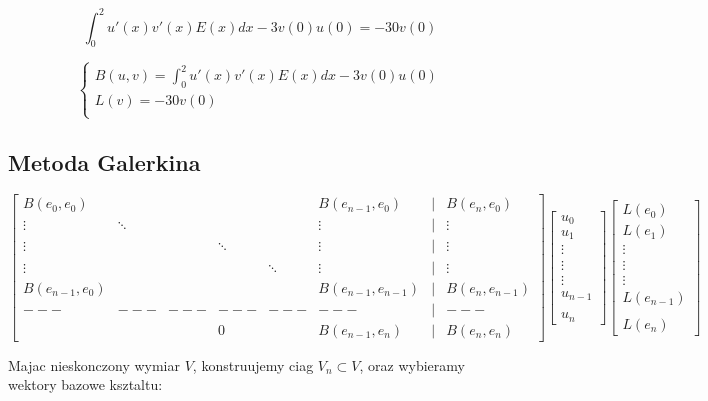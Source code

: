 \documentclass{article}
\begin{document}
\[\int_0^2{u'(x)v'(x)E(x)dx} - 3v(0)u(0)= -30 v(0)\]

\begin{equation*}
  \begin{cases}
B(u,v) =\int_0^2{u'(x)v'(x)E(x)dx} - 3v(0)u(0) \\
 L(v) =  -30 v(0) \\
  \end{cases}
\end{equation*}

\subsection{Metoda Galerkina}
\begin{equation*}
\begin{bmatrix}B(e_0,e_0) & & & & & B(e_{n-1},e_0) & | & B(e_n,e_0) \\\vdots & \ddots & & & & \vdots & | &\vdots \\\vdots & & & \ddots & & \vdots & | &\vdots \\\vdots & & & & \ddots & \vdots & | &\vdots \\ B(e_{n-1},e_0) & & & & & B(e_{n-1},e_{n-1}) & | & B(e_n,e_{n-1}) \\- - - & - - - & - - - & - - - & - - - & - - - & | & - - - \\& & & 0 & & B(e_{n-1},e_n) & | & B(e_{n},e_n)\end{bmatrix}\begin{bmatrix}u_0 \\u_1 \\\vdots \\\vdots \\\vdots \\u_{n-1} \\\\u_n \end{bmatrix}\begin{bmatrix}L(e_0) \\L(e_1) \\\vdots \\\vdots \\\vdots \\L(e_{n-1}) \\\\L(e_n) \end{bmatrix}
\end{equation*}

Majac nieskonczony wymiar \(V\), konstruujemy ciag \(V_n \subset V\), oraz wybieramy wektory bazowe ksztaltu:
\end{document}
